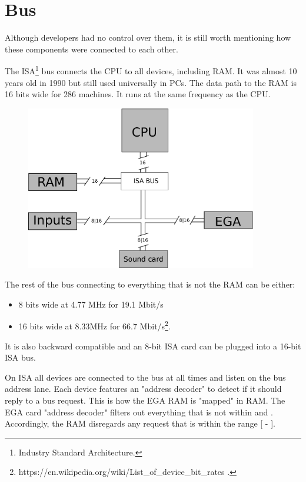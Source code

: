 \documentclass[book.tex]{subfiles}
\begin{document}
\section{Bus}
Although developers had no control over them, it is still worth mentioning how these components were connected to each other.\\ 
\par

The ISA\footnote{Industry Standard Architecture.} bus connects the CPU to all devices, including RAM. It was almost 10 years old in 1990 but still used universally in PCs. The data path to the RAM is 16 bits wide for 286 machines. It runs at the same frequency as the CPU.\\
\par

\begin{figure}[H]
\centering
      \includegraphics[width=0.9\textwidth]{imgs/drawings/bus.eps}
\end{figure}
\pagebreak
The rest of the bus connecting to everything that is not the RAM can be either:
\begin{itemize}
\item 8 bits wide at 4.77 MHz  for 19.1 Mbit/s
\item 16 bits wide at 8.33MHz for 66.7 Mbit/s\footnote{https://en.wikipedia.org/wiki/List\_of\_device\_bit\_rates .}.
\end{itemize}
It is also backward compatible and an 8-bit ISA card can be plugged into a 16-bit ISA bus.\\
\par
\vspace{10pt}
 On ISA all devices are connected to the bus at all times and listen on the bus address lane. Each device features an "address decoder" to detect if it should reply to a bus request. This is how the EGA RAM is "mapped" in RAM. The EGA card "address decoder"  filters out everything that is not within  and . Accordingly, the RAM disregards any request that is within the range [ - ].\\
\end{document}
